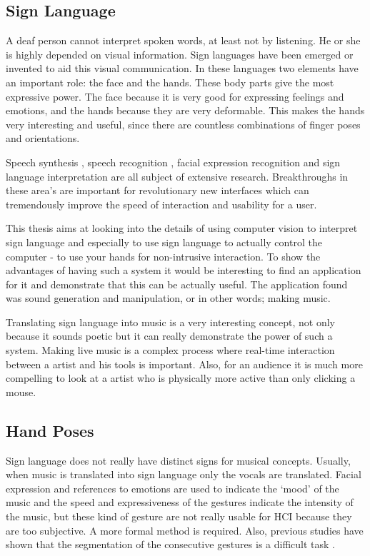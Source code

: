 \subsection*{Sign Language}

A deaf person cannot interpret spoken words, at least not by listening. He or she is highly depended on visual information. Sign languages have been emerged or invented to aid this visual communication. In these languages two elements have an important role: the face and the hands. These body parts give the most expressive power. The face because it is very good for expressing feelings and emotions, and the hands because they are very deformable. This makes the hands very interesting and useful, since there are countless combinations of finger poses and orientations. 

Speech synthesis \citep{Schroder2001, Hunt1996}, speech recognition \citep{rabiner1993, rabiner1989}, facial expression recognition \citep{Cohen2003, zhang2002} and sign language interpretation \citep{Buehler2009,RichardBowden2004,Cooper2007} are all subject of extensive research. Breakthroughs in these area's are important for revolutionary new interfaces which can tremendously improve the speed of interaction and usability for a user. 



This thesis aims at looking into the details of using computer vision to interpret sign language and especially to use sign language to actually control the computer - to use your hands for non-intrusive interaction. To show the advantages of having such a system it would be interesting to find an application for it and demonstrate that this can be actually useful. The application found was sound generation and manipulation, or in other words; making music. 

Translating sign language into music is a very interesting concept, not only because it sounds poetic but it can really demonstrate the power of such a system. Making live music is a complex process where real-time interaction between a artist and his tools is important. Also, for an audience it is much more compelling to look at a artist who is physically more active than only clicking a mouse.

\subsection*{Hand Poses}
Sign language does not really have distinct signs for musical concepts. Usually, when music is translated into sign language only the vocals are translated. Facial expression and references to emotions are used to indicate the `mood' of the music and the speed and expressiveness of the gestures indicate the intensity of the music, but these kind of gesture are not really usable for HCI because they are too subjective. A more formal method is required. Also, previous studies have shown that the segmentation of the consecutive gestures is a difficult task \citep{Buehler2009,RichardBowden2004}.

